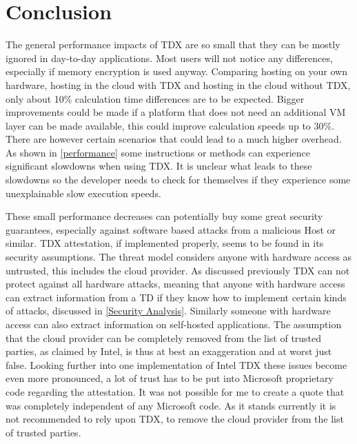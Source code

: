 
\chapter{Conclusion}
\label{ch:Conclusion}

The general performance impacts of TDX are so small that they can be mostly ignored in day-to-day applications. Most users will not notice any differences, especially if memory encryption is used anyway. Comparing hosting on your own hardware, hosting in the cloud with TDX and hosting in the cloud without TDX, only about 10\% calculation time differences are to be expected. Bigger improvements could be made if a platform that does not need an additional VM layer can be made available, this could improve calculation speeds up to 30\%. There are however certain scenarios that could lead to a much higher overhead. As shown in \cref{performance} some instructions or methods can experience significant slowdowns when using TDX. It is unclear what leads to these slowdowns so the developer needs to check for themselves if they experience some unexplainable slow execution speeds.

These small performance decreases can potentially buy some great security guarantees, especially against software based attacks from a malicious Host or similar. TDX attestation, if implemented properly, seems to be found in its security assumptions. The threat model considers anyone with hardware access as untrusted, this includes the cloud provider. As discussed previously TDX can not protect against all hardware attacks, meaning that anyone with hardware access can extract information from a TD if they know how to implement certain kinds of attacks, discussed in \cref{Security Analysis}. Similarly someone with hardware access can also extract information on self-hosted applications. The assumption that the cloud provider can be completely removed from the list of trusted parties, as claimed by Intel, is thus at best an exaggeration and at worst just false. Looking further into one implementation of Intel TDX these issues become even more pronounced, a lot of trust has to be put into Microsoft proprietary code regarding the attestation. It was not possible for me to create a quote that was completely independent of any Microsoft code. As it stands currently it is not recommended to rely upon TDX, to remove the cloud provider from the list of trusted parties.


